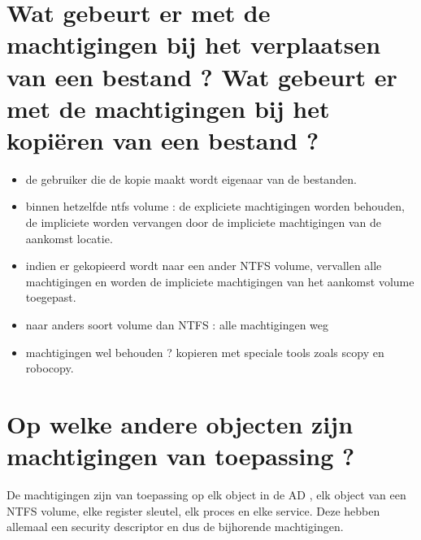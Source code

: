 \clearpage

\section{Wat gebeurt er met de machtigingen bij het verplaatsen van een bestand ? Wat gebeurt er met de machtigingen bij het kopi\"eren van een bestand ?}
\begin{itemize}
\item de gebruiker die de kopie maakt wordt eigenaar van de bestanden.
\item binnen hetzelfde ntfs volume : de expliciete machtigingen worden behouden, de impliciete worden vervangen door de impliciete machtigingen van de aankomst locatie.
\item indien er gekopieerd wordt naar een ander NTFS volume, vervallen alle machtigingen en worden de impliciete machtigingen van het aankomst volume toegepast.
\item naar anders soort volume dan NTFS : alle machtigingen weg
\item machtigingen wel behouden ? kopieren met speciale tools zoals scopy en robocopy.
\end{itemize}

\section{Op welke andere objecten zijn machtigingen van toepassing ?}

De machtigingen zijn van toepassing op elk object in de AD , elk object van een NTFS volume, elke register sleutel, elk proces en elke service.
Deze hebben allemaal een security descriptor en dus de bijhorende machtigingen.

